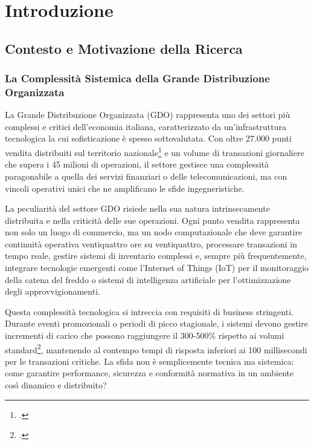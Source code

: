 
\chapter{Introduzione}

\section{Contesto e Motivazione della Ricerca}

\subsection{La Complessità Sistemica della Grande Distribuzione Organizzata}

La Grande Distribuzione Organizzata (GDO) rappresenta uno dei settori più complessi e critici dell'economia italiana, caratterizzato da un'infrastruttura tecnologica la cui sofisticazione è spesso sottovalutata. Con oltre 27.000 punti vendita distribuiti sul territorio nazionale\footcite{istat2024} e un volume di transazioni giornaliere che supera i 45 milioni di operazioni, il settore gestisce una complessità paragonabile a quella dei servizi finanziari o delle telecomunicazioni, ma con vincoli operativi unici che ne amplificano le sfide ingegneristiche.

La peculiarità del settore GDO risiede nella sua natura intrinsecamente distribuita e nella criticità delle sue operazioni. Ogni punto vendita rappresenta non solo un luogo di commercio, ma un nodo computazionale che deve garantire continuità operativa ventiquattro ore su ventiquattro, processare transazioni in tempo reale, gestire sistemi di inventario complessi e, sempre più frequentemente, integrare tecnologie emergenti come l'Internet of Things (IoT) per il monitoraggio della catena del freddo o sistemi di intelligenza artificiale per l'ottimizzazione degli approvvigionamenti.

Questa complessità tecnologica si intreccia con requisiti di business stringenti. Durante eventi promozionali o periodi di picco stagionale, i sistemi devono gestire incrementi di carico che possono raggiungere il 300-500\% rispetto ai volumi standard\footcite{capgemini2024}, mantenendo al contempo tempi di risposta inferiori ai 100 millisecondi per le transazioni critiche. La sfida non è semplicemente tecnica ma sistemica: come garantire performance, sicurezza e conformità normativa in un ambiente così dinamico e distribuito?

